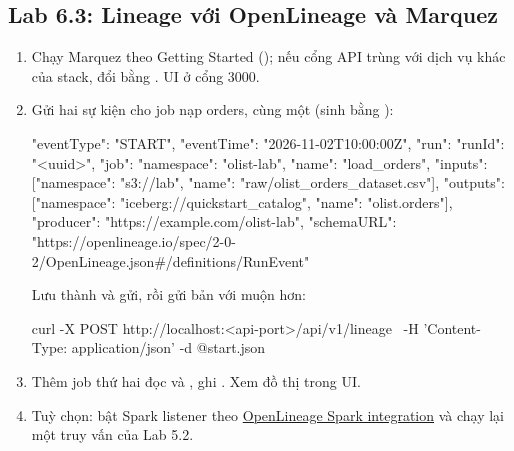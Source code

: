 \subsection{Lab 6.3: Lineage với OpenLineage và Marquez}
\begin{enumerate}
  \item Chạy Marquez theo Getting Started (); nếu cổng API trùng với dịch vụ khác của stack, đổi bằng . UI ở cổng 3000.
  \item Gửi hai sự kiện cho job nạp orders, cùng một  (sinh bằng ):
\begin{codeblock}
{"eventType": "START", "eventTime": "2026-11-02T10:00:00Z",
 "run": {"runId": "<uuid>"},
 "job": {"namespace": "olist-lab", "name": "load_orders"},
 "inputs":  [{"namespace": "s3://lab", "name": "raw/olist_orders_dataset.csv"}],
 "outputs": [{"namespace": "iceberg://quickstart_catalog", "name": "olist.orders"}],
 "producer": "https://example.com/olist-lab",
 "schemaURL": "https://openlineage.io/spec/2-0-2/OpenLineage.json#/definitions/RunEvent"}
\end{codeblock}
  Lưu thành  và gửi, rồi gửi bản  với  muộn hơn:
\begin{codeblock}
curl -X POST http://localhost:<api-port>/api/v1/lineage \
  -H 'Content-Type: application/json' -d @start.json
\end{codeblock}
  \item Thêm job thứ hai  đọc  và , ghi . Xem đồ thị trong UI.
  \item Tuỳ chọn: bật Spark listener theo \href{https://openlineage.io/docs/integrations/spark/configuration/usage}{OpenLineage Spark integration} và chạy lại một truy vấn của Lab 5.2.
\end{enumerate}

